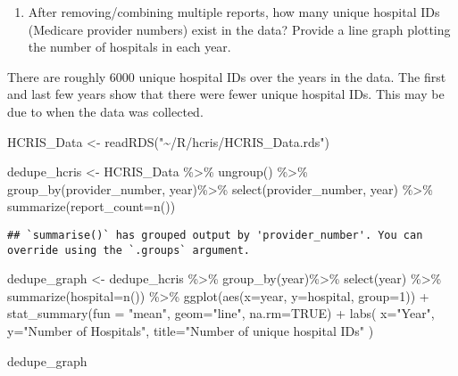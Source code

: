 \documentclass[
]{article}
\newenvironment{Shaded}{\begin{snugshade}}{\end{snugshade}}
\newcommand{\AttributeTok}[1]{\textcolor[rgb]{0.77,0.63,0.00}{#1}}
\newcommand{\ConstantTok}[1]{\textcolor[rgb]{0.00,0.00,0.00}{#1}}
\newcommand{\DecValTok}[1]{\textcolor[rgb]{0.00,0.00,0.81}{#1}}
\newcommand{\FunctionTok}[1]{\textcolor[rgb]{0.00,0.00,0.00}{#1}}
\newcommand{\NormalTok}[1]{#1}
\newcommand{\OtherTok}[1]{\textcolor[rgb]{0.56,0.35,0.01}{#1}}
\newcommand{\SpecialCharTok}[1]{\textcolor[rgb]{0.00,0.00,0.00}{#1}}
\newcommand{\StringTok}[1]{\textcolor[rgb]{0.31,0.60,0.02}{#1}}
\providecommand{\tightlist}{%
  \setlength{\itemsep}{0pt}\setlength{\parskip}{0pt}}
\begin{document}
\begin{enumerate}
\def\labelenumi{\arabic{enumi}.}
\setcounter{enumi}{2}
\tightlist
\item
  After removing/combining multiple reports, how many unique hospital
  IDs (Medicare provider numbers) exist in the data? Provide a line
  graph plotting the number of hospitals in each year.
\end{enumerate}

There are roughly 6000 unique hospital IDs over the years in the data.
The first and last few years show that there were fewer unique hospital
IDs. This may be due to when the data was collected.

\begin{Shaded}
\begin{Highlighting}[]
\NormalTok{HCRIS\_Data }\OtherTok{\textless{}{-}} \FunctionTok{readRDS}\NormalTok{(}\StringTok{"\textasciitilde{}/R/hcris/HCRIS\_Data.rds"}\NormalTok{)}

\NormalTok{dedupe\_hcris }\OtherTok{\textless{}{-}}\NormalTok{ HCRIS\_Data }\SpecialCharTok{\%\textgreater{}\%}
  \FunctionTok{ungroup}\NormalTok{() }\SpecialCharTok{\%\textgreater{}\%}
  \FunctionTok{group\_by}\NormalTok{(provider\_number, year)}\SpecialCharTok{\%\textgreater{}\%}
  \FunctionTok{select}\NormalTok{(provider\_number, year) }\SpecialCharTok{\%\textgreater{}\%}
  \FunctionTok{summarize}\NormalTok{(}\AttributeTok{report\_count=}\FunctionTok{n}\NormalTok{())}
\end{Highlighting}
\end{Shaded}

\begin{verbatim}
## `summarise()` has grouped output by 'provider_number'. You can override using the `.groups` argument.
\end{verbatim}

\begin{Shaded}
\begin{Highlighting}[]
\NormalTok{  dedupe\_graph }\OtherTok{\textless{}{-}}\NormalTok{ dedupe\_hcris }\SpecialCharTok{\%\textgreater{}\%}
  \FunctionTok{group\_by}\NormalTok{(year)}\SpecialCharTok{\%\textgreater{}\%}
  \FunctionTok{select}\NormalTok{(year) }\SpecialCharTok{\%\textgreater{}\%}
  \FunctionTok{summarize}\NormalTok{(}\AttributeTok{hospital=}\FunctionTok{n}\NormalTok{()) }\SpecialCharTok{\%\textgreater{}\%}
  \FunctionTok{ggplot}\NormalTok{(}\FunctionTok{aes}\NormalTok{(}\AttributeTok{x=}\NormalTok{year, }\AttributeTok{y=}\NormalTok{hospital, }\AttributeTok{group=}\DecValTok{1}\NormalTok{)) }\SpecialCharTok{+}
  \FunctionTok{stat\_summary}\NormalTok{(}\AttributeTok{fun =} \StringTok{"mean"}\NormalTok{, }\AttributeTok{geom=}\StringTok{"line"}\NormalTok{, }\AttributeTok{na.rm=}\ConstantTok{TRUE}\NormalTok{) }\SpecialCharTok{+}
  \FunctionTok{labs}\NormalTok{(}
    \AttributeTok{x=}\StringTok{"Year"}\NormalTok{,}
    \AttributeTok{y=}\StringTok{"Number of Hospitals"}\NormalTok{,}
    \AttributeTok{title=}\StringTok{"Number of unique hospital IDs"}
\NormalTok{  )}

\NormalTok{dedupe\_graph}
\end{Highlighting}
\end{Shaded}
\end{document}

